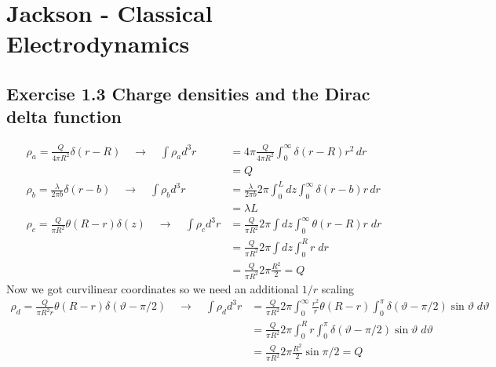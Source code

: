 \documentclass[../main.tex]{subfiles}
\begin{document}
\section{{\sc Jackson} - Classical Electrodynamics}

\subsection{Exercise 1.3 Charge densities and the Dirac delta function}
\begin{align}
\rho_a=\frac{Q}{4\pi R^2}\delta(r-R)\quad\rightarrow\quad \int\rho_a d^3r&=4\pi\frac{Q}{4\pi R^2}\int_0^\infty\delta(r-R)r^2\,dr\\&=Q\\
\rho_b=\frac{\lambda}{2\pi b}\delta(r-b)\quad\rightarrow\quad \int\rho_b d^3r&=\frac{\lambda}{2\pi b}2\pi\int_0^Ldz\int_0^\infty \delta(r-b)r\,dr\\&=\lambda L\\
\rho_c=\frac{Q}{\pi R^2}\theta(R-r)\delta(z)\quad\rightarrow\quad \int\rho_c d^3r&=\frac{Q}{\pi R^2}2\pi\int dz\int_0^\infty\theta(r-R)r\;dr\\
&=\frac{Q}{\pi R^2}2\pi\int dz\int_0^Rr\;dr\\
&=\frac{Q}{\pi R^2}2\pi\frac{R^2}{2}=Q
\end{align}
Now we got curvilinear coordinates so we need an additional $1/r$ scaling
\begin{align}
\rho_d=\frac{Q}{\pi R^2r}\theta(R-r)\delta(\vartheta-\pi/2)\quad\rightarrow\quad \int\rho_d d^3r&=\frac{Q}{\pi R^2}2\pi\int_0^\infty \frac{r^2}{r}\theta(R-r)\int_0^\pi\delta(\vartheta-\pi/2)\sin\vartheta\;d\vartheta\\
&=\frac{Q}{\pi R^2}2\pi\int_0^R r\int_0^\pi\delta(\vartheta-\pi/2)\sin\vartheta\;d\vartheta\\
&=\frac{Q}{\pi R^2}2\pi \frac{R^2}{2}\sin\pi/2=Q
\end{align}
\end{document}
